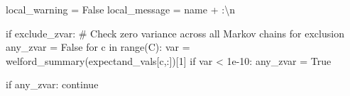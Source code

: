\documentclass[
  letterpaper,
  DIV=11,
  numbers=noendperiod]{scrartcl}
\newenvironment{Shaded}{\begin{snugshade}}{\end{snugshade}}
\newcommand{\BuiltInTok}[1]{\textcolor[rgb]{0.00,0.23,0.31}{#1}}
\newcommand{\CharTok}[1]{\textcolor[rgb]{0.13,0.47,0.30}{#1}}
\newcommand{\CommentTok}[1]{\textcolor[rgb]{0.37,0.37,0.37}{#1}}
\newcommand{\ControlFlowTok}[1]{\textcolor[rgb]{0.00,0.23,0.31}{#1}}
\newcommand{\DecValTok}[1]{\textcolor[rgb]{0.68,0.00,0.00}{#1}}
\newcommand{\FloatTok}[1]{\textcolor[rgb]{0.68,0.00,0.00}{#1}}
\newcommand{\KeywordTok}[1]{\textcolor[rgb]{0.00,0.23,0.31}{#1}}
\newcommand{\NormalTok}[1]{\textcolor[rgb]{0.00,0.23,0.31}{#1}}
\newcommand{\OperatorTok}[1]{\textcolor[rgb]{0.37,0.37,0.37}{#1}}
\newcommand{\StringTok}[1]{\textcolor[rgb]{0.13,0.47,0.30}{#1}}
\newcommand{\VariableTok}[1]{\textcolor[rgb]{0.07,0.07,0.07}{#1}}
\begin{document}
\begin{Shaded}
\begin{Highlighting}[]
\NormalTok{    local\_warning }\OperatorTok{=} \VariableTok{False}
\NormalTok{    local\_message }\OperatorTok{=}\NormalTok{ name }\OperatorTok{+} \StringTok{\textquotesingle{}:}\CharTok{\textbackslash{}n}\StringTok{\textquotesingle{}}
  
    \ControlFlowTok{if}\NormalTok{ exclude\_zvar:}
      \CommentTok{\# Check zero variance across all Markov chains for exclusion}
\NormalTok{      any\_zvar }\OperatorTok{=} \VariableTok{False}
      \ControlFlowTok{for}\NormalTok{ c }\KeywordTok{in} \BuiltInTok{range}\NormalTok{(C):}
\NormalTok{        var }\OperatorTok{=}\NormalTok{ welford\_summary(expectand\_vals[c,:])[}\DecValTok{1}\NormalTok{]}
        \ControlFlowTok{if}\NormalTok{ var }\OperatorTok{\textless{}} \FloatTok{1e{-}10}\NormalTok{:}
\NormalTok{          any\_zvar }\OperatorTok{=} \VariableTok{True}
      
      \ControlFlowTok{if}\NormalTok{ any\_zvar:}
        \ControlFlowTok{continue}
    

\end{Highlighting}
\end{Shaded}
\end{document}

